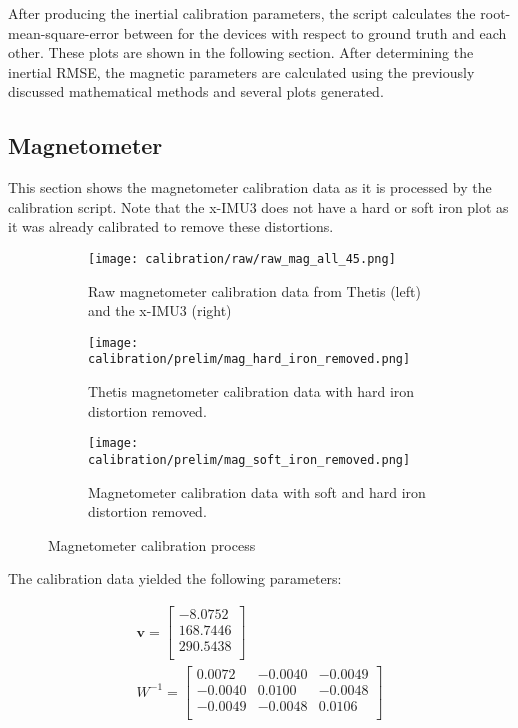 After producing the inertial calibration parameters, the script calculates the root-mean-square-error between for the devices with respect to ground truth and each other. 
These plots are shown in the following section.
After determining the inertial RMSE, the magnetic parameters are calculated using the previously discussed mathematical methods and several plots generated.

\subsection{Magnetometer}
This section shows the magnetometer calibration data as it is processed by the calibration script.
Note that the x-IMU3 does not have a hard or soft iron plot as it was already calibrated to remove these distortions.

\begin{figure}
    \centering
    \begin{subfigure}[b]{0.6\textwidth}
        \centering
        \texttt{[image: calibration/raw/raw\_mag\_all\_45.png]}
        \caption[Raw Magnetometer Readings]{Raw magnetometer calibration data from Thetis (left) and the x-IMU3 (right)}
    \end{subfigure}
    \hfill
    \begin{subfigure}[b]{0.3\textwidth}
        \centering
        \texttt{[image: calibration/prelim/mag\_hard\_iron\_removed.png]}
        \caption[Hard Iron Distortion Removed]{Thetis magnetometer calibration data with hard iron distortion removed.}
    \end{subfigure}
    \hfill
    \begin{subfigure}[b]{0.5\textwidth}
        \centering
        \texttt{[image: calibration/prelim/mag\_soft\_iron\_removed.png]}
        \caption[Soft Iron Distortion Removed]{Magnetometer calibration data with soft and hard iron distortion removed.}
    \end{subfigure}
       \caption{Magnetometer calibration process}
\end{figure}

The calibration data yielded the following parameters:

\begin{gather}
    \pmb{v} = \begin{bmatrix}
        -8.0752 \\
        168.7446 \\
        290.5438 \\
    \end{bmatrix} \\
    W^{-1} = \begin{bmatrix}
        0.0072 & -0.0040 & -0.0049 \\
        -0.0040 & 0.0100 & -0.0048 \\
        -0.0049 & -0.0048 & 0.0106 \\
    \end{bmatrix}
\end{gather}

